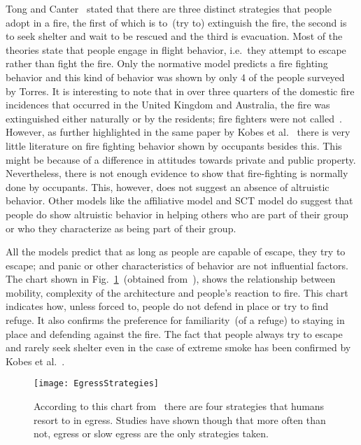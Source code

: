 Tong and Canter~\cite{Tong:1985wn} stated that there are three distinct strategies that people adopt in a fire, the first of which is to~(try to) extinguish the fire, the second is to seek shelter and wait to be rescued and the third is evacuation. Most of the theories state that people engage in flight behavior, i.e.\ they attempt to escape rather than fight the fire. Only the normative model predicts a fire fighting behavior and this kind of behavior was shown by only 4 of the people surveyed by Torres. It is interesting to note that in over three quarters of the domestic fire incidences that occurred in the United Kingdom and Australia, the fire was extinguished either naturally or by the residents; fire fighters were not called~\cite{Kobes:2009jx}. However, as further highlighted in the same paper by Kobes et al.~\cite{Kobes:2009jx} there is very little literature on fire fighting behavior shown by occupants besides this. This might be because of a difference in attitudes towards private and public property. Nevertheless, there is not enough evidence to show that fire-fighting is normally done by occupants. This, however, does not suggest an absence of altruistic behavior. Other models like the affiliative model and SCT model do suggest that people do show altruistic behavior in helping others who are part of their group or who they characterize as being part of their group.

All the models predict that as long as people are capable of escape, they try to escape; and panic or other characteristics of behavior are not influential factors. The chart shown in Fig.~\ref{fig:EgressAge}~(obtained from~\cite{Klupfel:2005to}), shows the relationship between mobility, complexity of the architecture and people's reaction to fire. This chart indicates how, unless forced to, people do not defend in place or try to find refuge. It also confirms the preference for familiarity~(of a refuge) to staying in place and defending against the fire. The fact that people always try to escape and rarely seek shelter even in the case of extreme smoke has been confirmed by Kobes et al.~\cite{Kobes:2009jx}.

\begin{figure}[!htb]
\centering
\texttt{[image: EgressStrategies]}
\caption[Strategies for Egress]{According to this chart from~\cite{Klupfel:2005to} there are four strategies that humans resort to in egress. Studies have shown though that more often than not, egress or slow egress are the only strategies taken.}
\label{fig:EgressAge}
\end{figure}

